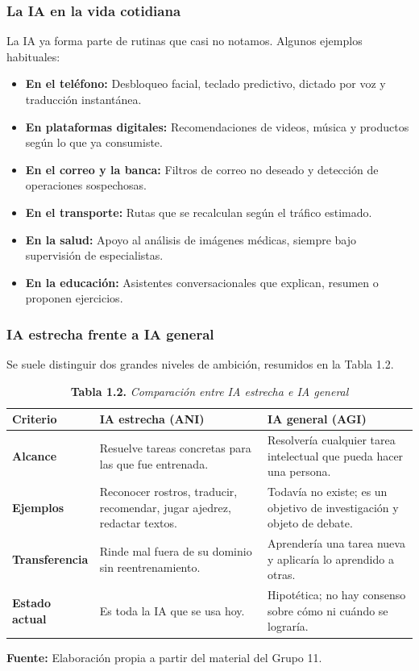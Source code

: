 \subsubsection{La IA en la vida cotidiana}
La IA ya forma parte de rutinas que casi no notamos. Algunos ejemplos habituales:
\begin{itemize}
    \item \textbf{En el teléfono:} Desbloqueo facial, teclado predictivo, dictado por voz y traducción instantánea.
    \item \textbf{En plataformas digitales:} Recomendaciones de videos, música y productos según lo que ya consumiste.
    \item \textbf{En el correo y la banca:} Filtros de correo no deseado y detección de operaciones sospechosas.
    \item \textbf{En el transporte:} Rutas que se recalculan según el tráfico estimado.
    \item \textbf{En la salud:} Apoyo al análisis de imágenes médicas, siempre bajo supervisión de especialistas.
    \item \textbf{En la educación:} Asistentes conversacionales que explican, resumen o proponen ejercicios.
\end{itemize}

\subsubsection{IA estrecha frente a IA general}
Se suele distinguir dos grandes niveles de ambición, resumidos en la Tabla 1.2.

\begin{table}[htpb!]
\centering
\small\sffamily
\caption{\textbf{Tabla 1.2.} \textit{Comparación entre IA estrecha e IA general}}
\vspace{0.15cm}
\begin{tabularx}{\textwidth}{>{\bfseries}p{2.8cm} >{\raggedright\arraybackslash}p{6.0cm} >{\raggedright\arraybackslash}X}
\toprule
Criterio & IA estrecha (ANI) & IA general (AGI) \\
\midrule
Alcance & Resuelve tareas concretas para las que fue entrenada. & Resolvería cualquier tarea intelectual que pueda hacer una persona. \\
\midrule
Ejemplos & Reconocer rostros, traducir, recomendar, jugar ajedrez, redactar textos. & Todavía no existe; es un objetivo de investigación y objeto de debate. \\
\midrule
Transferencia & Rinde mal fuera de su dominio sin reentrenamiento. & Aprendería una tarea nueva y aplicaría lo aprendido a otras. \\
\midrule
Estado actual & Es toda la IA que se usa hoy. & Hipotética; no hay consenso sobre cómo ni cuándo se lograría. \\
\bottomrule
\end{tabularx}
\vspace{0.15cm}
\raggedright\scriptsize \textbf{Fuente:} Elaboración propia a partir del material del Grupo 11.
\end{table}

